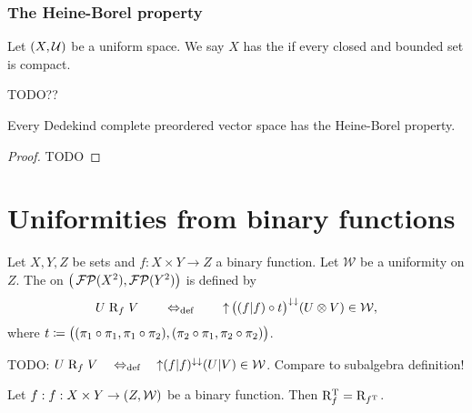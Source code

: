 \subsubsection{The Heine-Borel property}
\begin{definition}
Let $\sSet{X,\mathcal{U}}$ be a uniform space. We say $X$ has the  if every closed and bounded set is compact.
\end{definition}

TODO??
\begin{proposition} \label{DedekindCompleteHeineBorel}
Every Dedekind complete preordered vector space has the Heine-Borel property.
\end{proposition}
\begin{proof}
TODO
\end{proof}

\section{Uniformities from binary functions}
\begin{definition}
Let $X,Y,Z$ be sets and $f: X\times Y\to Z$ a binary function. Let $\mathcal{W}$ be a uniformity on $Z$. The  on $\big(\operatorname{\mathcal{FP}}(X^2),\operatorname{\mathcal{FP}}(Y^2)\big)$ is defined by
\[ U\mathrel{\mathrm{R}_{f}} V \quad\quad\Leftrightarrow_{\text{def}}\quad\quad \operatorname{\uparrow}\big((f|f)\circ t \big)^{\downarrow\downarrow}(U\otimes V) \in \mathcal{W}, \]
where $t \coloneqq \big((\pi_1\circ \pi_1, \pi_1\circ \pi_2),(\pi_2\circ \pi_1, \pi_2\circ \pi_2)\big)$.
\end{definition}

TODO: $U\mathrel{\mathrm{R}_{f}} V \quad\Leftrightarrow_{\text{def}}\quad \operatorname{\uparrow}(f|f)^{\downarrow\downarrow}(U|V) \in \mathcal{W}$. Compare to subalgebra definition!

\begin{lemma} \label{transposeFunctionalUniformRelation}
Let $f: f: X\times Y\to \sSet{Z, \mathcal{W}}$ be a binary function. Then $\mathrm{R}_{f}^{\mathrm{T}} = \mathrm{R}_{f^{\mathrm{T}}}$.
\end{lemma}

